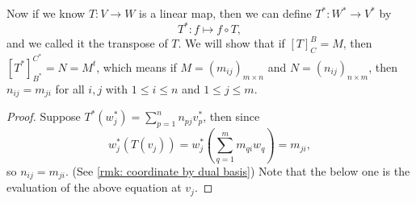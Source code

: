Now if we know \(T: V \to W\) is a linear map, then we can define \(T^*: W^* \to V^*\) by 
\[
    T^*: f \mapsto f \circ T,
\] and we called it the transpose of \(T\). We will show that if \([T]_C^B = M\), then \(\left[ T^* \right]^{C^*}_{B^*} = N = M^t\), which means if \(M = (m_{ij})_{m \times n}\) and \(N = (n_{ij})_{n \times m}\), then \(n_{ij} = m_{ji}\) for all \(i, j\) with \(1 \le i \le n\) and \(1 \le j \le m\). 
\begin{proof}
    Suppose \(T^* \left( w_j^* \right) = \sum_{p=1}^{n} n_{pj} v_p^*  \), then since
    \[
        w_j^* \left( T(v_j) \right) = w_j^* \left( \sum_{q=1}^{m} m_{qi} w_q  \right) = m_{ji},
    \] so \(n_{ij} = m_{ji}\). (See \autoref{rmk: coordinate by dual basis}) Note that the below one is the evaluation of the above equation at \(v_j\).  
\end{proof}         
